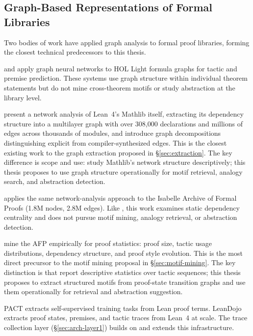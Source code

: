\documentclass[12pt, a4paper]{article}
\begin{document}
\subsection{Graph-Based Representations of Formal Libraries}
\label{sec:related-graphs}

Two bodies of work have applied graph analysis to formal proof libraries,
forming the closest technical predecessors to this thesis.

\citet{paliwal2020graph} and \citet{bansal2019holist} apply graph neural
networks to HOL Light formula graphs for tactic and premise prediction. These
systems use graph structure within individual theorem statements but do not
mine cross-theorem motifs or study abstraction at the library level.

\citet{li2026networkstructure} present a network analysis of Lean~4's
Mathlib itself, extracting its dependency structure into a multilayer graph
with over 308,000 declarations and millions of edges across thousands of
modules, and introduce graph decompositions distinguishing explicit from
compiler-synthesized edges. This is the closest existing work to the graph
extraction proposed in \S\ref{sec:extraction}. The key difference is scope
and use: \citeauthor{li2026networkstructure} study Mathlib's network structure
descriptively; this thesis proposes to use graph structure operationally for
motif retrieval, analogy search, and abstraction detection.

\citet{huch2022} applies the same network-analysis approach to the Isabelle
Archive of Formal Proofs (1.8M nodes, 2.8M edges). Like
\citeauthor{li2026networkstructure}, this work examines static dependency
centrality and does not pursue motif mining, analogy retrieval, or abstraction
detection.

\citet{blanchette2015mining} mine the AFP empirically for proof statistics:
proof size, tactic usage distributions, dependency structure, and proof style
evolution. This is the most direct precursor to the motif mining proposal in
\S\ref{sec:motif-mining}. The key distinction is that
\citeauthor{blanchette2015mining} report descriptive statistics over tactic
sequences; this thesis proposes to extract structured motifs from proof-state
transition graphs and use them operationally for retrieval and abstraction
suggestion.

PACT \citep{han2021pact} extracts self-supervised training tasks from Lean
proof terms. LeanDojo \citep{yang2023leandojo} extracts proof states,
premises, and tactic traces from Lean~4 at scale. The trace collection layer
(\S\ref{sec:arch-layer1}) builds on and extends this infrastructure.
\end{document}
